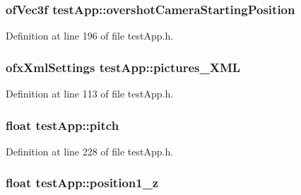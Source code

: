 \hypertarget{classtest_app_a846feea7c2c4d4b1929bb72c546b3e19}{
\subsubsection[{overshot\-Camera\-Starting\-Position}]{\setlength{\rightskip}{0pt plus 5cm}of\-Vec3f test\-App\-::overshot\-Camera\-Starting\-Position}}\label{classtest_app_a846feea7c2c4d4b1929bb72c546b3e19}


Definition at line 196 of file test\-App.\-h.

\hypertarget{classtest_app_a85133f49103cfa002f39d882f7168236}{
\subsubsection[{pictures\-\_\-\-X\-M\-L}]{\setlength{\rightskip}{0pt plus 5cm}ofx\-Xml\-Settings test\-App\-::pictures\-\_\-\-X\-M\-L}}\label{classtest_app_a85133f49103cfa002f39d882f7168236}


Definition at line 113 of file test\-App.\-h.

\hypertarget{classtest_app_aabbebeb113838374f659e86a0355b260}{
\subsubsection[{pitch}]{\setlength{\rightskip}{0pt plus 5cm}float test\-App\-::pitch}}\label{classtest_app_aabbebeb113838374f659e86a0355b260}


Definition at line 228 of file test\-App.\-h.

\hypertarget{classtest_app_a808376783cdf510335cd1b37026e9bb3}{
\subsubsection[{position1\-\_\-z}]{\setlength{\rightskip}{0pt plus 5cm}float test\-App\-::position1\-\_\-z}}\label{classtest_app_a808376783cdf510335cd1b37026e9bb3}


